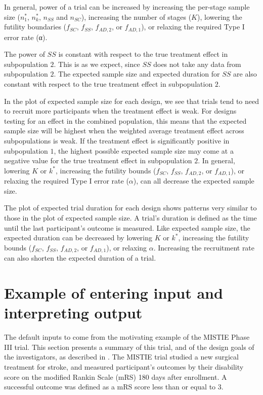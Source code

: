 \documentclass[article]{jss}
\begin{document}
In general, power of a trial can be increased by increasing the per-stage sample size ($n_1^*$, $n_k^*$, $n_{SS}$ and $n_{SC}$), increasing the number of stages ($K$), lowering the futility boundaries ($f_{SC}$, $f_{SS}$, $f_{AD,2}$, or $f_{AD,1}$), or relaxing the required Type I error rate (α).

The power of $SS$ is constant with respect to the true treatment effect in subpopulation $2$. This is as we expect, since $SS$ does not take any data from subpopulation $2$. The expected sample size and expected duration for $SS$ are also constant with respect to the true treatment effect in subpopulation $2$.

In the plot of expected sample size for each design, we see that trials tend to need to recruit more participants when the treatment effect is weak. For designs testing for an effect in the combined population, this means that the expected sample size will be highest when the weighted average treatment effect across subpopulations is weak. If the treatment effect is significantly positive in subpopulation $1$, the highest possible expected sample size may come at a negative value for the true treatment effect in subpopulation $2$. In general, lowering $K$ or $k^*$, increasing the futility bounds ($f_{SC}$, $f_{SS}$, $f_{AD,2}$, or $f_{AD,1}$), or relaxing the required Type I error rate ($α$), can all decrease the expected sample size.

The plot of expected trial duration for each design shows patterns very similar to those in the plot of expected sample size. A trial's duration is defined as the time until the last participant's outcome is measured. Like expected sample size, the expected duration can be decreased by lowering $K$ or $k^*$, increasing the futility bounds ($f_{SC}$, $f_{SS}$, $f_{AD,2}$, or $f_{AD,1}$), or relaxing $α$. Increasing the recruitment rate can also shorten the expected duration of a trial.



\section{Example of entering input and interpreting output}
\label{sec:example}

The default inputs to  come from the motivating example of the MISTIE Phase III trial. This section presents a summary of this trial, and of the design goals of the investigators, as described in \citep{Rosenblum2013AdaptMISTIE}. The MISTIE trial studied a new surgical treatment for stroke, and measured participant's outcomes by their disability score on the modified Rankin Scale (mRS) 180 days after enrollment. A successful outcome was defined as a mRS score less than or equal to 3. %
\end{document}
